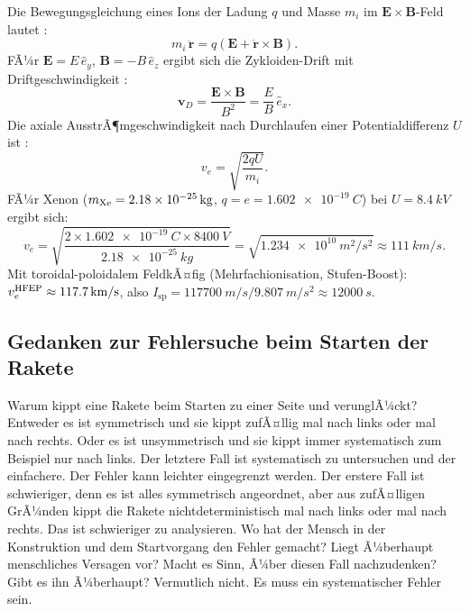 ﻿\documentclass[a4paper,12pt,twoside]{article}
\theoremstyle{plain}
\theoremstyle{definition}
\theoremstyle{remark}
\newcommand{\Isp}{I_{\mathrm{sp}}}
\newcommand{\ve}{v_e}
\begin{document}
	Die Bewegungsgleichung eines Ions der Ladung $q$ und Masse $m_i$ im
	$\mathbf{E}\times\mathbf{B}$-Feld lautet \cite{stuhlinger1964, lieberman2005}:
	\begin{equation}
		m_i\,\ddot{\mathbf{r}} = q(\mathbf{E} + \dot{\mathbf{r}}\times\mathbf{B}).
		\label{eq:lorentz}
	\end{equation}
	FÃ¼r $\mathbf{E} = E\,\hat{e}_y$, $\mathbf{B} = -B\,\hat{e}_z$ ergibt sich die
	Zykloiden-Drift mit Driftgeschwindigkeit \cite{zhurin1999, morozov2003}:
	\begin{equation}
		\mathbf{v}_D = \frac{\mathbf{E}\times\mathbf{B}}{B^2}
		= \frac{E}{B}\,\hat{e}_x.
		\label{eq:exb_drift}
	\end{equation}
	Die axiale AusstrÃ¶mgeschwindigkeit nach Durchlaufen einer Potentialdifferenz $U$ ist
	\cite{goebel2008, jahn1968}:
	\begin{equation}
		\ve = \sqrt{\frac{2qU}{m_i}}.
		\label{eq:exhaust_velocity}
	\end{equation}
	FÃ¼r Xenon ($m_{\rm Xe} = \SI{2.18e-25}{kg}$, $q = e = \SI{1.602e-19}{C}$)
	bei $U = \SI{8.4}{kV}$ ergibt sich:
	\begin{equation}
		\ve = \sqrt{\frac{2\times\SI{1.602e-19}{C}\times\SI{8400}{V}}{\SI{2.18e-25}{kg}}}
		= \sqrt{\SI{1.234e10}{m^2/s^2}}
		\approx \SI{111}{km/s}.
		\label{eq:ve_xe}
	\end{equation}
	Mit toroidal-poloidalem FeldkÃ¤fig (Mehrfachionisation, Stufen-Boost):
	$\ve^{\rm HFEP} \approx \SI{117.7}{km/s}$, also $\Isp = \SI{117700}{m/s}/\SI{9.807}{m/s^2}
	\approx \SI{12000}{s}$.
	
	\subsection{Gedanken zur Fehlersuche beim Starten der Rakete}
	Warum kippt eine Rakete beim Starten zu einer Seite und verunglÃ¼ckt? Entweder es ist symmetrisch und sie kippt zufÃ¤llig mal nach links oder mal nach rechts. Oder es ist unsymmetrisch und sie kippt immer systematisch zum Beispiel nur nach links. Der letztere Fall ist systematisch zu untersuchen und der einfachere. Der Fehler kann leichter eingegrenzt werden. Der erstere Fall ist schwieriger, denn es ist alles symmetrisch angeordnet, aber aus zufÃ¤lligen GrÃ¼nden kippt die Rakete nichtdeterministisch mal nach links oder mal nach rechts. Das ist schwieriger zu analysieren. Wo hat der Mensch in der Konstruktion und dem Startvorgang den Fehler gemacht? Liegt Ã¼berhaupt menschliches Versagen vor? Macht es Sinn, Ã¼ber diesen Fall nachzudenken? Gibt es ihn Ã¼berhaupt? Vermutlich nicht. Es muss ein systematischer Fehler sein.
	
\end{document}

